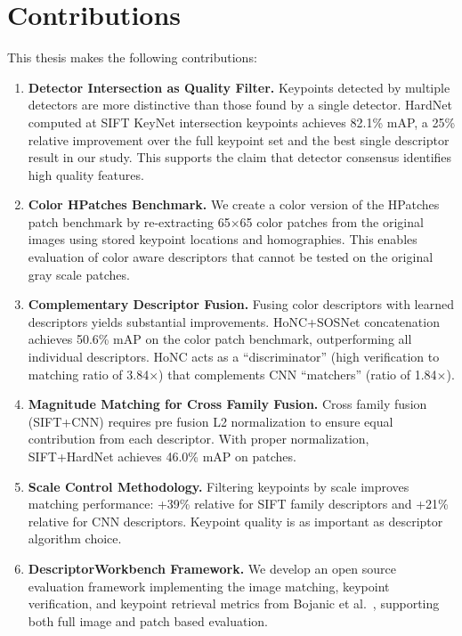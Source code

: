 \section{Contributions}

This thesis makes the following contributions:

\begin{enumerate}
    \item \textbf{Detector Intersection as Quality Filter.} Keypoints detected by multiple detectors are more distinctive than those found by a single detector. HardNet computed at SIFT KeyNet intersection keypoints achieves 82.1\% mAP, a 25\% relative improvement over the full keypoint set and the best single descriptor result in our study. This supports the claim that detector consensus identifies high quality features.

    \item \textbf{Color HPatches Benchmark.} We create a color version of the HPatches patch benchmark by re-extracting 65$\times$65 color patches from the original images using stored keypoint locations and homographies. This enables evaluation of color aware descriptors that cannot be tested on the original gray scale patches.

    \item \textbf{Complementary Descriptor Fusion.} Fusing color descriptors with learned descriptors yields substantial improvements. HoNC+SOSNet concatenation achieves 50.6\% mAP on the color patch benchmark, outperforming all individual descriptors. HoNC acts as a ``discriminator'' (high verification to matching ratio of 3.84$\times$) that complements CNN ``matchers'' (ratio of 1.84$\times$).

    \item \textbf{Magnitude Matching for Cross Family Fusion.} Cross family fusion (SIFT+CNN) requires pre fusion L2 normalization to ensure equal contribution from each descriptor. With proper normalization, SIFT+HardNet achieves 46.0\% mAP on patches.

    \item \textbf{Scale Control Methodology.} Filtering keypoints by scale improves matching performance: +39\% relative for SIFT family descriptors and +21\% relative for CNN descriptors. Keypoint quality is as important as descriptor algorithm choice.

    \item \textbf{DescriptorWorkbench Framework.} We develop an open source evaluation framework implementing the image matching, keypoint verification, and keypoint retrieval metrics from Bojanic et al.~\cite{bojanic2020comparison}, supporting both full image and patch based evaluation.
\end{enumerate}

